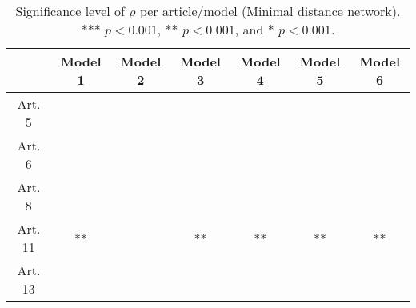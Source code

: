 \begin{table}[ht]
\centering
\begin{tabular}{ccccccc}
  \toprule
 & Model 1 & Model 2 & Model 3 & Model 4 & Model 5 & Model 6 \\ 
  \midrule
Art. 5 &   &   &   &   &   &   \\ 
   \midrule
Art. 6 &   &   &   &   &   &   \\ 
   \midrule
Art. 8 &   &   &   &   &   &   \\ 
   \midrule
Art. 11 & ** &   & ** & ** & ** & ** \\ 
   \midrule
Art. 13 &   &   &   &   &   &   \\ 
   \bottomrule
\end{tabular}
\caption{Significance level of $\rho$ per article/model (Minimal distance network). *** $p < 0.001$, ** $p < 0.001$, and * $p < 0.001$.} 
\end{table}
